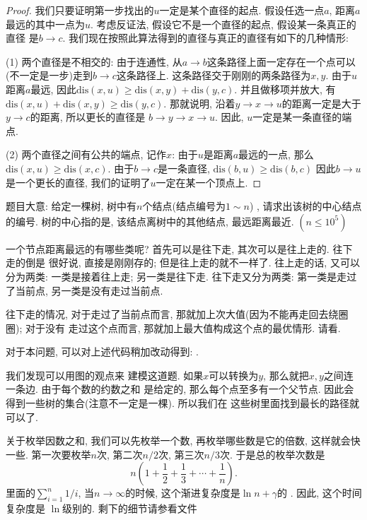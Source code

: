 \begin{proof}
    我们只要证明第一步找出的$u$一定是某个直径的起点. 假设任选一点$a$, 距离$a$
    最远的其中一点为$u$. 考虑反证法, 假设它不是一个直径的起点, 假设某一条真正的直径
    是$b\to c$. 我们现在按照此算法得到的直径与真正的直径有如下的几种情形: 

    (1) 两个直径是不相交的: 由于连通性, 从$a\to b$这条路径上面一定存在一个点可以
    (不一定是一步)走到$b\to c$这条路径上. 这条路径交于刚刚的两条路径为$x, y$. 
    由于$u$距离$a$最远, 因此$\text{dis}(x, u)\geq \text{dis}(x,y)+\text{dis}(y,c)$. 
    并且做移项并放大, 有$\text{dis}(x, u)+\text{dis}(x,y) \geq \text{dis}(y,c)$.
    那就说明, 沿着$y\to x\to u$的距离一定是大于$y\to c$的距离, 所以更长的直径是
    $b\to y\to x\to u$. 因此, $u$一定是某一条直径的端点. 
    
    (2) 两个直径之间有公共的端点, 记作$x$: 由于$u$是距离$a$最远的一点, 那么
    $\text{dis}{(x,u)}\geq \text{dis}{(x, c)}$. 由于$b\to c$是一条直径, $\text{dis}(b,u)\geq \text{dis}(b,c)$
    因此$b\to u$是一个更长的直径, 我们的证明了$u$一定在某一个顶点上. 
    
\end{proof}

题目大意: 给定一棵树, 树中有$n$个结点(结点编号为$1\sim n$)
, 请求出该树的中心结点的编号. 树的中心指的是, 该结点离树中的其他结点, 最远距离最近. $(n\leq 10^5)$

一个节点距离最远的有哪些类呢? 首先可以是往下走, 其次可以是往上走的. 往下走的倒是
很好说, 直接是刚刚存的; 但是往上走的就不一样了. 往上走的话, 又可以分为两类: 一类是接着往上走; 
另一类是往下走. 往下走又分为两类: 第一类是走过了当前点, 另一类是没有走过当前点. 

往下走的情况, 对于走过了当前点而言, 那就加上次大值(因为不能再走回去绕圈圈); 对于没有
走过这个点而言, 那就加上最大值构成这个点的最优情形. 请看.

对于本问题, 可以对上述代码稍加改动得到: .

 我们发现可以用图的观点来
建模这道题. 如果$x$可以转换为$y$, 那么就把$x, y$之间连一条边. 由于每个数的约数之和
是给定的, 那么每个点至多有一个父节点. 因此会得到一些树的集合(注意不一定是一棵). 所以我们在
这些树里面找到最长的路径就可以了. 

关于枚举因数之和, 我们可以先枚举一个数, 再枚举哪些数是它的倍数, 这样就会快一些. 
第一次要枚举$n$次, 第二次$n/2$次, 第三次$n/3$次. 于是总的枚举次数是
$$
n\left(1+\frac12 +\frac13+\cdots + \frac1n\right).
$$
里面的$\sum_{i=1}^{n} 1/i$, 当$n\to \infty$的时候, 这个渐进复杂度是$\ln n + \gamma$的
. 
因此, 这个时间复杂度是
$\ln$级别的. 剩下的细节请参看文件

